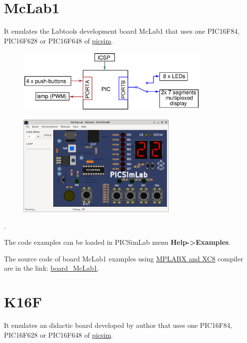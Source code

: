 \section{McLab1}

It emulates the Labtools development board McLab1 that uses one PIC16F84, PIC16F628 or PIC16F648 of \href{https://github.com/lcgamboa/picsim}{picsim}.

\begin{figure}[H]
\center
\includegraphics[width=0.85\textwidth]{img/blocks_p1.eps} 
\end{figure} 


\begin{figure}[H]
\center
\includegraphics[width=0.7\textwidth]{img/picsimlab1.png} 
\end{figure} 

.\vspace{0.5cm}

The code examples can be loaded in PICSimLab menu \textbf{Help->Examples}.

The source code of board McLab1 examples using \href{http://www.microchip.com/mplabx}{MPLABX and XC8} compiler 
are in the link: \href{https://lcgamboa.github.io/picsimlab_examples/board_McLab1.html}{board\_McLab1}.

\section{K16F}

It emulates an didactic board developed by author that uses one PIC16F84, PIC16F628 or PIC16F648 of \href{https://github.com/lcgamboa/picsim}{picsim}.

